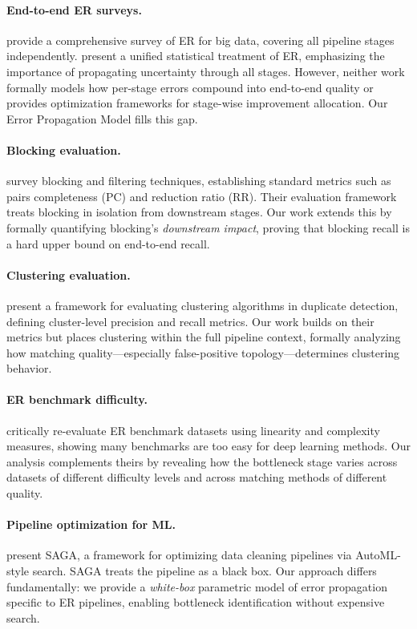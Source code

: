 \documentclass{article}
\begin{document}
\paragraph{End-to-end ER surveys.}
\citet{christophides2020overview} provide a comprehensive survey of ER for big data, covering all pipeline stages independently.
\citet{binette2022almost} present a unified statistical treatment of ER, emphasizing the importance of propagating uncertainty through all stages.
However, neither work formally models how per-stage errors compound into end-to-end quality or provides optimization frameworks for stage-wise improvement allocation.
Our Error Propagation Model fills this gap.

\paragraph{Blocking evaluation.}
\citet{papadakis2020blocking} survey blocking and filtering techniques, establishing standard metrics such as pairs completeness (PC) and reduction ratio (RR).
Their evaluation framework treats blocking in isolation from downstream stages.
Our work extends this by formally quantifying blocking's \emph{downstream impact}, proving that blocking recall is a hard upper bound on end-to-end recall.

\paragraph{Clustering evaluation.}
\citet{hassanzadeh2009framework} present a framework for evaluating clustering algorithms in duplicate detection, defining cluster-level precision and recall metrics.
Our work builds on their metrics but places clustering within the full pipeline context, formally analyzing how matching quality---especially false-positive topology---determines clustering behavior.

\paragraph{ER benchmark difficulty.}
\citet{papadakis2023critical} critically re-evaluate ER benchmark datasets using linearity and complexity measures, showing many benchmarks are too easy for deep learning methods.
Our analysis complements theirs by revealing how the bottleneck stage varies across datasets of different difficulty levels and across matching methods of different quality.

\paragraph{Pipeline optimization for ML.}
\citet{siddiqi2023saga} present SAGA, a framework for optimizing data cleaning pipelines via AutoML-style search.
SAGA treats the pipeline as a black box.
Our approach differs fundamentally: we provide a \emph{white-box} parametric model of error propagation specific to ER pipelines, enabling bottleneck identification without expensive search.
\end{document}
